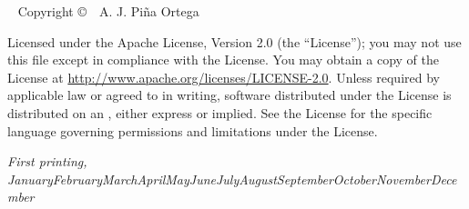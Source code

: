 \documentclass[justified]{tufte-book} %
\newcommand{\monthyear}{\ifcase\month\or January\or February\or March\or April\or May\or June\or July\or August\or September\or October\or November\or December\fi\space\number\year} %
\begin{document}
\newpage
\begin{fullwidth}
~\vfill
\thispagestyle{empty}
\setlength{\parindent}{0pt}
\setlength{\parskip}{\baselineskip}
Copyright \copyright\ \the\year\ A. J. Pi\~{n}a Ortega

\par{}

\par{}

\par Licensed under the Apache License, Version 2.0 (the ``License''); you may not
use this file except in compliance with the License. You may obtain a copy
of the License at \url{http://www.apache.org/licenses/LICENSE-2.0}. Unless
required by applicable law or agreed to in writing, software distributed
under the License is distributed on an , either express or implied. See the
License for the specific language governing permissions and limitations
under the License.

\par\textit{First printing, \monthyear}
\end{fullwidth}

\begin{fullwidth}
\tableofcontents %


\listoffigures %


\listoftables %
\end{fullwidth}


\end{document}
